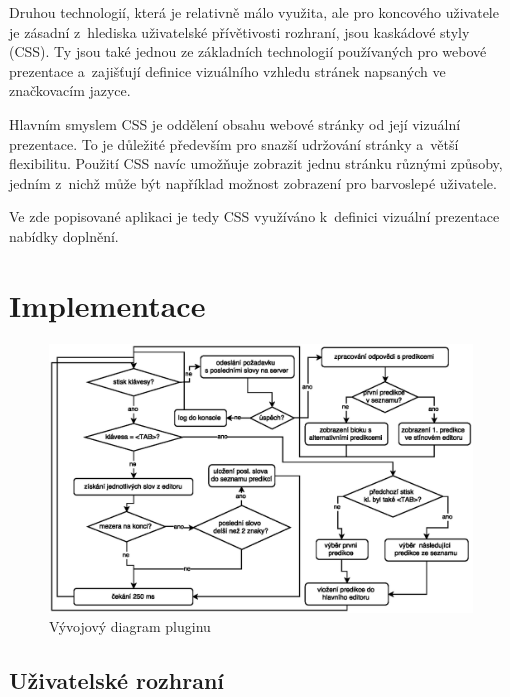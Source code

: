 \documentclass[a4paper,11pt,openany]{book} %
\begin{document}
\begin{spacing}{1.05}
Druhou technologií, která je relativně málo využita, ale pro koncového uživatele je zásadní z~hlediska uživatelské přívětivosti rozhraní, jsou kaskádové styly (CSS). Ty jsou také jednou ze základních technologií používaných pro webové prezentace a~zajišťují definice vizuálního vzhledu stránek napsaných ve značkovacím jazyce. \parencite{meyer2004cascading}

Hlavním smyslem CSS je oddělení obsahu webové stránky od její vizuální prezentace. To je důležité především pro snazší udržování stránky a~větší flexibilitu. Použití CSS navíc umožňuje zobrazit jednu stránku různými způsoby, jedním z~nichž může být například možnost zobrazení pro barvoslepé uživatele.

Ve zde popisované aplikaci je tedy CSS využíváno k~definici vizuální prezentace nabídky doplnění.
\end{spacing}

\chapter{Implementace}

\begin{figure}[h]
	\centering
	\includegraphics[width=1.0\textwidth]{autocomplete_floatchart.eps}
	\caption{Vývojový diagram pluginu}
	\label{fig:autocomplete_floatchart}
\end{figure}

\section{Uživatelské rozhraní}\label{ui}
\end{document}
